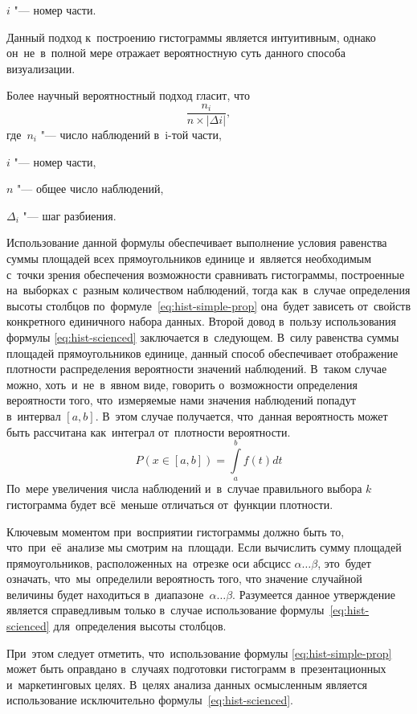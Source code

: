 \documentclass[]{scrartcl}
\begin{document}
$i$ "--- номер части. 

Данный подход к~построению гистограммы является интуитивным, однако он~не~в~полной мере отражает вероятностную суть данного способа визуализации.

Более научный вероятностный подход гласит, что
\begin{equation}\label{eq:hist-scienced}
\frac{n_{i}}{n \times |\Delta{i}|},
\end{equation}
где~$n_{i}$ "--- число наблюдений в~i-той части,

$i$ "--- номер части,

$n$ "--- общее число наблюдений,

$\Delta_{i}$ "--- шаг разбиения.

Использование данной формулы обеспечивает выполнение условия равенства суммы площадей всех
прямоугольников единице и~является необходимым с~точки зрения обеспечения возможности сравнивать гистограммы, построенные на~выборках с~разным количеством наблюдений, тогда как~в~случае определения высоты столбцов по~формуле~\ref{eq:hist-simple-prop} она~будет зависеть от~свойств конкретного единичного набора данных.
Второй довод в~пользу использования формулы \ref{eq:hist-scienced} заключается в~следующем. В~силу равенства суммы площадей прямоугольников единице, данный способ обеспечивает отображение плотности распределения вероятности значений наблюдений.
В~таком случае можно, хоть~и~не~в~явном виде, говорить о~возможности определения вероятности того, что~измеряемые нами значения наблюдений попадут в~интервал $[a, b]$. В~этом случае получается, что~данная вероятность может быть рассчитана как~интеграл от~плотности вероятности.
\begin{equation}\label{eq:prob-integral}
P(x \in [a, b]) = \int \limits_{a}^{b} f (t)dt
\end{equation}
По~мере увеличения числа наблюдений и~в~случае правильного выбора $k$ гистограмма будет всё~меньше отличаться от~функции плотности.

Ключевым моментом при~восприятии гистограммы должно быть то, что~при~её~анализе мы смотрим на~площади. Если вычислить сумму площадей прямоугольников, расположенных на~отрезке оси абсцисс $\alpha \ldots \beta$, это~будет означать, что~мы~определили вероятность того, что значение случайной величины будет находиться в~диапазоне~$\alpha \ldots \beta$. Разумеется данное утверждение является справедливым только в~случае использование формулы~\ref{eq:hist-scienced} для~определения высоты столбцов.

При~этом следует отметить, что~использование формулы \ref{eq:hist-simple-prop} может быть оправдано в~случаях подготовки гистограмм в~презентационных и~маркетинговых целях. В~целях анализа данных осмысленным является использование исключительно формулы~\ref{eq:hist-scienced}.
\end{document}
